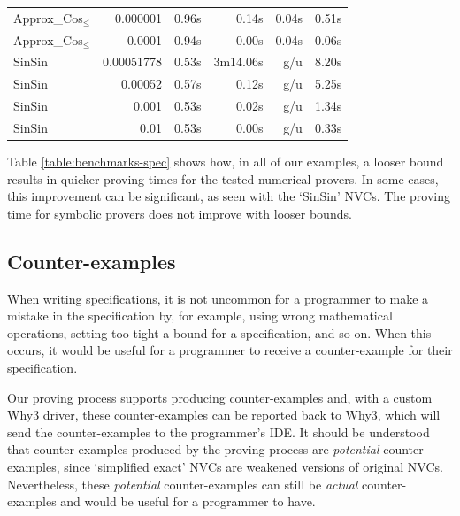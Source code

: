 \documentclass[runningheads]{llncs}
\begin{document}
\begin{table}[tb]
\begin{tabular}{l@{\kern1em}r@{\kern1em}r@{\kern1em}r@{\kern1em}r@{\kern1em}r}
  Approx\_Cos${}_\le$                 & 0.000001      & 0.96s         & 0.14s     & 0.04s       & 0.51s \\
  Approx\_Cos${}_\le$                 & 0.0001        & 0.94s         & 0.00s     & 0.04s       & 0.06s \\[1ex]
  SinSin                              & 0.00051778    & 0.53s         & 3m14.06s  & g/u         & 8.20s \\
  SinSin                              & 0.00052       & 0.57s         & 0.12s     & g/u         & 5.25s \\
  SinSin                              & 0.001         & 0.53s         & 0.02s     & g/u         & 1.34s \\
  SinSin                              & 0.01          & 0.53s         & 0.00s     & g/u         & 0.33s \\
  \bottomrule
  \end{tabular}
\end{table}

Table \ref{table:benchmarks-spec} shows how, in all of our examples, a looser bound results in quicker proving times for the tested numerical provers.
In some cases, this improvement can be significant, as seen with the `SinSin' NVCs.
The proving time for symbolic provers does not improve with looser bounds. %

\subsection{Counter-examples}
When writing specifications, it is not uncommon for a programmer to make a mistake in the specification by, for example, using wrong mathematical operations, setting too tight a bound for a specification, and so on.
When this occurs, it would be useful for a programmer to receive a counter-example for their specification.

Our proving process supports producing counter-examples and, with a custom Why3 driver, these counter-examples can be reported back to Why3, which will send the counter-examples to the programmer's IDE.
It should be understood that counter-examples produced by the proving process are \emph{potential} counter-examples, since `simplified exact' NVCs are weakened versions of original NVCs.
Nevertheless, these \emph{potential} counter-examples can still be \emph{actual} counter-examples and would be useful for a programmer to have.
\end{document}
